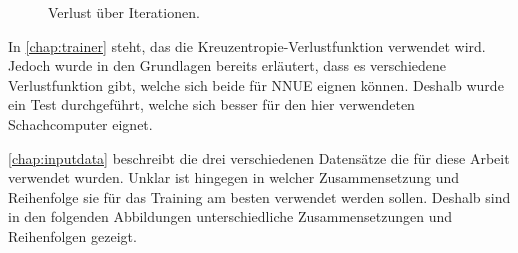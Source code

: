 \begin{figure}
  \centering
  \caption{Verlust über Iterationen.}
  \label{fig:loss}
\end{figure}





In \autoref{chap:trainer} steht, das die Kreuzentropie-Verlustfunktion verwendet wird. Jedoch wurde in den Grundlagen bereits erläutert, dass es verschiedene Verlustfunktion gibt, welche sich beide für \ac{NNUE} eignen können. Deshalb wurde ein Test durchgeführt, welche sich besser für den hier verwendeten Schachcomputer eignet.

\autoref{chap:inputdata} beschreibt die drei verschiedenen Datensätze die für diese Arbeit verwendet wurden. Unklar ist hingegen in welcher Zusammensetzung und Reihenfolge sie für das Training am besten verwendet werden sollen. Deshalb sind in den folgenden Abbildungen unterschiedliche Zusammensetzungen und Reihenfolgen gezeigt.
